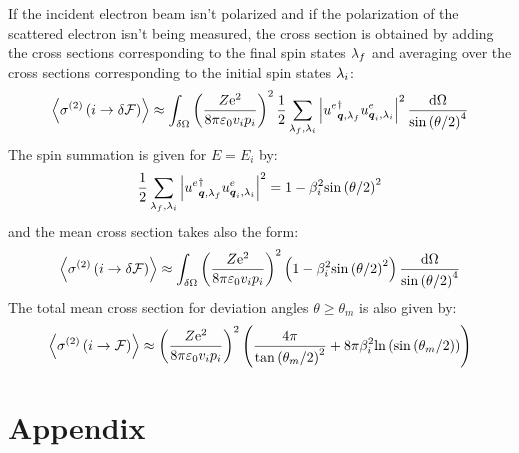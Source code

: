 \documentclass[10pt,a4paper,twoside,openany]{book}
\begin{document}
If the incident electron beam isn't polarized and if the polarization of the scattered electron isn't being measured, the cross section is obtained by adding the cross sections corresponding to the final spin states $\sp_f$ and averaging over the cross sections corresponding to the initial spin states $\sp_i$:
\begin{equation*}
\left< \CSn i {\delta \F} 2 \right> \approx \int_{\delta \Omega} \left( \frac {Z \e^2} {8 \pi \vpty v_i p_i} \right)^2 \frac 1 2 \sum_{\sp_f,\sp_i} \left| \ddirspin \electron \q {\sp_f} \dirspin \electron {\q_i} {\sp_i} \right|^2 \frac {\dO} {\sin{\theta / 2}^4}
\end{equation*}
The spin summation is given for $E = E_i$ by:
\begin{equation*}
\frac 1 2 \sum_{\sp_f,\sp_i} \left| \ddirspin \electron \q {\sp_f} \dirspin \electron {\q_i} {\sp_i} \right|^2 = 1 - \beta_i^2 \sin{\theta / 2}^2
\end{equation*}
and the mean cross section takes also the form:
\begin{equation*}
\left< \CSn i {\delta \F} 2 \right> \approx \int_{\delta \Omega} \left( \frac {Z \e^2} {8 \pi \vpty v_i p_i} \right)^2 \left( 1 - \beta_i^2 \sin{\theta / 2}^2 \right) \frac {\dO} {\sin{\theta / 2}^4}
\end{equation*}
The total mean cross section for deviation angles $\theta \geq \theta_m$ is also given by:
\begin{equation*}
\left< \CSn i \F 2 \right> \approx \left( \frac {Z \e^2} {8 \pi \vpty v_i p_i} \right)^2 \left( \frac {4 \pi} {\tan{\theta_m / 2}^2} + 8 \pi \beta_i^2 \ln{\sin{\theta_m / 2}} \right)
\end{equation*}


\appendix

\part{Appendix}
\end{document}
